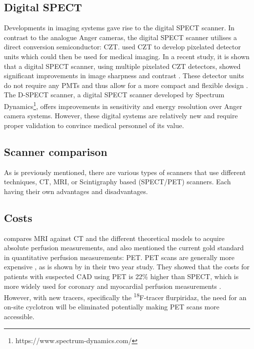 \subsection*{Digital SPECT}
Developments in imaging systems gave rise to the digital \ac{SPECT} scanner. In contrast to the analogue Anger cameras, the digital \ac{SPECT} scanner utilises a direct conversion semiconductor: \ac{CZT}. \cite{wagenaar2004cdte} used \ac{CZT} to develop pixelated detector units which could then be used for medical imaging. In a recent study, it is shown that a digital \ac{SPECT} scanner, using multiple pixelated \ac{CZT} detectors, showed significant improvements in image sharpness and contrast \citep{goshen2018feasibility}. These detector units do not require any \acp{PMT} and thus allow for a more compact and flexible design \citep{erlandsson2009performance}. The D-SPECT scanner, a digital \ac{SPECT} scanner developed by Spectrum Dynamics\footnote{https://www.spectrum-dynamics.com/}, offers improvements in sensitivity and energy resolution \citep{SpectDynam2018} over Anger camera systems. However, these digital systems are relatively new and require proper validation to convince medical personnel of its value.

\subsection{Scanner comparison}
As is previously mentioned, there are various types of scanners that use different techniques, \ac{CT}, \ac{MRI}, or Scintigraphy based (\ac{SPECT}/\ac{PET}) scanners. Each having their own advantages and disadvantages.
\subsection*{Costs}
 \cite{pelgrim2016quantitative} compares \ac{MRI} against \ac{CT} and the different theoretical models to acquire absolute perfusion measurements, and also mentioned the current gold standard in quantitative perfusion measurements: \ac{PET}. \ac{PET} scans are generally more expensive \citep{RadioPead2018}, as is shown by \cite{hlatky2014economic} in their two year study. They showed that the costs for patients with suspected \ac{CAD} using \ac{PET} is 22\% higher than \ac{SPECT}, which is more widely used for coronary and myocardial perfusion measurements \citep{rahmim2008pet}. However, with new tracers, specifically the \textsuperscript{18}F-tracer flurpiridaz,  the need for an on-site cyclotron will be eliminated \citep{pelgrim2016quantitative} potentially making \ac{PET} scans more accessible.


